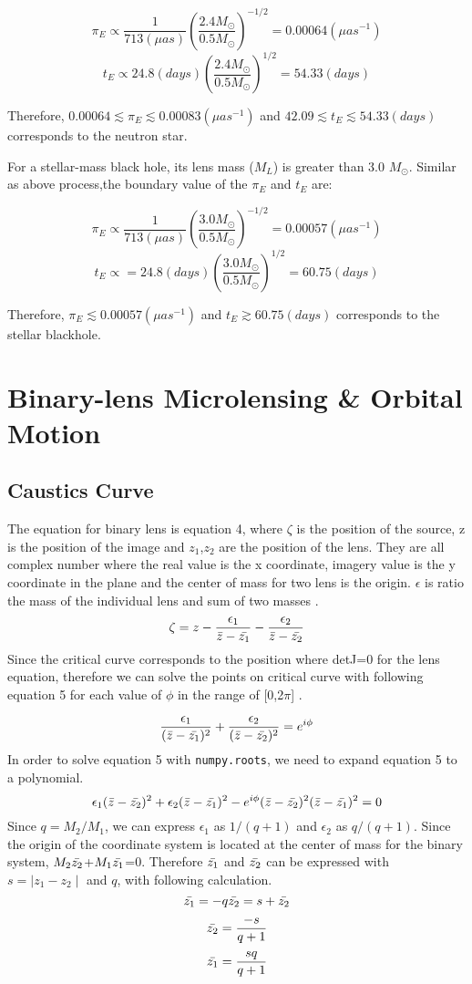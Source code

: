 \documentclass[preprint]{aastex63}
\begin{document}
   
$$\pi_E\propto\frac{1}{713(\mu as)} (\frac{2.4M_\odot}{0.5M_\odot})^{-1/2}=0.00064 (\mu as^{-1})$$
$$t_E\propto24.8 (days)(\frac{2.4M_\odot}{0.5M_\odot})^{1/2}=54.33 (days)$$

Therefore, $0.00064\lesssim\pi_E \lesssim 0.00083 (\mu as^{-1})$ and $42.09\lesssim t_E \lesssim 54.33 (days)$ corresponds to the neutron star.

For a stellar-mass black hole, its lens mass ($M_L$) is greater than 3.0 $M_\odot$. Similar as above process,the boundary value of the $\pi_E$ and $t_E$ are:

$$\pi_E\propto\frac{1}{713(\mu as)} (\frac{3.0M_\odot}{0.5M_\odot})^{-1/2}=0.00057 (\mu as^{-1})$$
$$t_E\propto=24.8 (days)(\frac{3.0M_\odot}{0.5M_\odot})^{1/2}=60.75 (days)$$

Therefore, $\pi_E \lesssim 0.00057 (\mu as^{-1})$ and $t_E \gtrsim 60.75 (days)$ corresponds to the stellar blackhole.
\medskip
\section{Binary-lens Microlensing \& Orbital Motion}
\bigskip
\subsection{Caustics Curve}
The equation for binary lens is equation 4, where $\zeta$ is the position of the source, z is the position of the image and $z_1$,$z_2$ are the position of the lens. They are all complex number where the real value is the x coordinate, imagery value is the y coordinate in the plane and the center of mass for two lens is the origin. $\epsilon$ is ratio the mass of the individual lens and sum of two masses \cite{2012ARA&A..50..411G}.
\begin{equation}
    \zeta=z-\frac{\epsilon_1}{\Bar{z}-\Bar{z_1}}-\frac{\epsilon_2}{\Bar{z}-\Bar{z_2}}
\end{equation}
Since the critical curve corresponds to the position where detJ=0 for the lens equation, therefore we can solve the points on critical curve with following equation 5 for each value of $\phi$ in the range of [0,2$\pi$] \cite{2012ARA&A..50..411G}.\par
\begin{equation}
    \frac{\epsilon_1}{(\Bar{z}-\Bar{z_1})^2}+\frac{\epsilon_2}{(\Bar{z}-\Bar{z_2})^2}=e^{i\phi}
\end{equation}
In order to solve equation 5 with \texttt{numpy.roots}, we need to expand equation 5 to a polynomial.
$$\epsilon_1(\Bar{z}-\Bar{z_2})^2+\epsilon_2(\Bar{z}-\Bar{z_1})^2-e^{i\phi}(\Bar{z}-\Bar{z_2})^2(\Bar{z}-\Bar{z_1})^2=0$$
Since $q=M_2/M_1$, we can express $\epsilon_1$ as $1/(q+1)$ and $\epsilon_2$ as $q/(q+1)$. Since the origin of the coordinate system is located at the center of mass for the binary system, $M_2\Bar{z_2}$+$M_1\Bar{z_1}$=0. Therefore $\Bar{z_1}$ and $\Bar{z_2}$ can be expressed with $s=\mid z_1-z_2 \mid$ and $q$, with following calculation.
$$\Bar{z_1}=-q\Bar{z_2}=s+\Bar{z_2}$$
$$\Bar{z_2}=\frac{-s}{q+1}$$
$$\Bar{z_1}=\frac{sq}{q+1}$$
\end{document}
